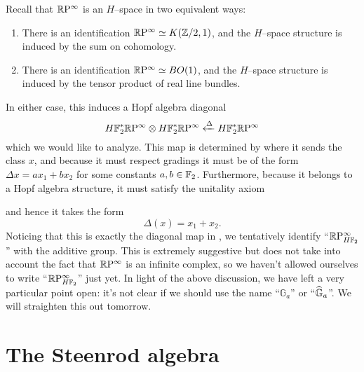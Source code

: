 \begin{example}\label{RPExampleFaulty}
Recall that $\mathbb R\mathrm P^\infty$ is an $H$--space in two equivalent ways:
\begin{enumerate}
\item There is an identification $\mathbb R\mathrm P^\infty \simeq K(\mathbb Z/2, 1)$, and the $H$--space structure is induced by the sum on cohomology.
\item There is an identification $\mathbb R\mathrm P^\infty \simeq BO(1)$, and the $H$--space structure is induced by the tensor product of real line bundles.
\end{enumerate}
In either case, this induces a Hopf algebra diagonal \[H\mathbb F_2^* \mathbb R\mathrm P^\infty \otimes H\mathbb F_2^* \mathbb R\mathrm P^\infty \xleftarrow\Delta H\mathbb F_2^* \mathbb R\mathrm P^\infty\] which we would like to analyze.  This map is determined by where it sends the class $x$, and because it must respect gradings it must be of the form $\Delta x = ax_1 + bx_2$ for some constants $a, b \in \mathbb F_2$.  Furthermore, because it belongs to a Hopf algebra structure, it must satisfy the unitality axiom
\begin{center}
\end{center}
and hence it takes the form \[\Delta(x) = x_1 + x_2.\]  Noticing that this is exactly the diagonal map in , we tentatively identify ``$\mathbb R\mathrm P^\infty_{H\mathbb F_2}$'' with the additive group.  This is extremely suggestive but does not take into account the fact that $\mathbb R\mathrm P^\infty$ is an infinite complex, so we haven't allowed ourselves to write ``$\mathbb R\mathrm P^\infty_{H\mathbb F_2}$'' just yet.  In light of the above discussion, we have left a very particular point open: it's not clear if we should use the name ``$\mathbb G_a$'' or ``$\widehat{\mathbb G}_a$''.  We will straighten this out tomorrow.
\end{example}








\section{The Steenrod algebra}\label{TheSteenrodAlgebraSection}


